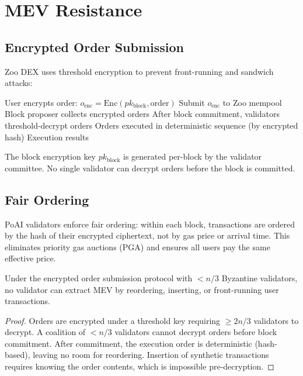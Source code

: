 \section{MEV Resistance}

\label{sec:mev}

\subsection{Encrypted Order Submission}

Zoo DEX uses threshold encryption to prevent front-running and sandwich attacks:

\begin{algorithm}[t]
\caption{Encrypted Order Submission}
\label{alg:mev}
\begin{algorithmic}[1]
\STATE User encrypts order: $o_{\text{enc}} = \text{Enc}(pk_{\text{block}}, \text{order})$
\STATE Submit $o_{\text{enc}}$ to Zoo mempool
\STATE Block proposer collects encrypted orders
\STATE After block commitment, validators threshold-decrypt orders
\STATE Orders executed in deterministic sequence (by encrypted hash)
\RETURN Execution results
\end{algorithmic}
\end{algorithm}

The block encryption key $pk_{\text{block}}$ is generated per-block by the validator committee. No single validator can decrypt orders before the block is committed.

\subsection{Fair Ordering}

PoAI validators enforce fair ordering: within each block, transactions are ordered by the hash of their encrypted ciphertext, not by gas price or arrival time. This eliminates priority gas auctions (PGA) and ensures all users pay the same effective price.

\begin{theorem}
Under the encrypted order submission protocol with $< n/3$ Byzantine validators, no validator can extract MEV by reordering, inserting, or front-running user transactions.
\end{theorem}

\begin{proof}
Orders are encrypted under a threshold key requiring $\geq 2n/3$ validators to decrypt. A coalition of $< n/3$ validators cannot decrypt orders before block commitment. After commitment, the execution order is deterministic (hash-based), leaving no room for reordering. Insertion of synthetic transactions requires knowing the order contents, which is impossible pre-decryption.
\end{proof}

